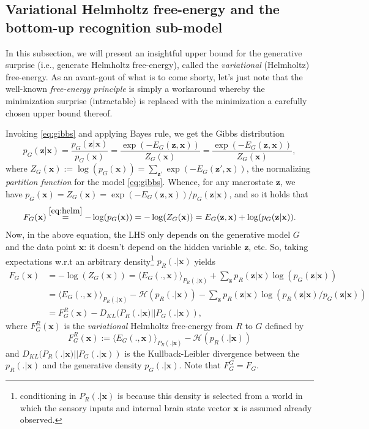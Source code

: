 \documentclass[10pt,letterpaper]{article}
\def\z{\mathbf{z}}
\def\x{\mathbf{x}}
\begin{document}
\subsection{Variational Helmholtz free-energy and the bottom-up recognition sub-model}
In this subsection, we will present an insightful upper bound for the generative surprise (i.e., generate Helmholtz free-energy), called the \textit{variational} (Helmholtz) free-energy. As an avant-gout of what is to come shorty, let's just note that the well-known \textit{free-energy principle} is simply a workaround whereby the minimization surprise (intractable) is replaced with the  minimization a carefully chosen upper bound thereof.

Invoking \eqref{eq:gibbs} and applying Bayes rule, we get the Gibbs
distribution
\begin{equation}
  p_G(\z|\x) = \frac{p_G(\z|\x)}{p_G(\x)} = \frac{\exp(-E_G(\z, \x))}{Z_G(\x)} = \frac{\exp(-E_G(\z, \x))}{Z_G(\x)},
\end{equation}
where $Z_G(\x) := \log(p_G(\x)) = \sum_{\z'}\exp(-E_G(\z',\x))$, the normalizing \textit{partition function} for the model \ref{eq:gibbs}.
Whence, for any macrostate $\z$, we have $p_G(\x) = Z_G(\x) = \exp(-E_G(\z, \x)) / p_G(\z|\x)$, and so it holds that
\begin{equation}
F_G(\x)\overset{\eqref{eq:helm}}{=} -\log(p_G(\x)) = -\log(Z_G(\x)) = E_G(\z, \x) + \log(p_G(\z|\x)).
\end{equation}
Now, in the above equation, the LHS only depends on the generative model $G$ and the data point $\x$:
it doesn't depend on the hidden variable $\z$, etc. So, taking expectations w.r.t an arbitrary
density\footnote{conditioning in $P_R(.|\x)$ is because this density is selected from a world in which the sensory inputs and internal brain
  state vector $\x$ is assumed already observed.} $p_R(.|\x)$ yields
\begin{equation}
  \begin{split}
    F_G(\x) &= -\log(Z_G(\x)) = \langle E_G(., \x)\rangle_{P_R(.|\x)} + \sum_{\z}p_R(\z|\x)\log(p_G(\z|\x))\\
    &= \langle E_G(., \x)\rangle_{P_R(.|\x)} - \mathcal H(p_R(.|\x)) - \sum_{\z}p_R(\z|\x)\log(p_R(\z|\x)/p_G(\z|\x))\\
    &= F^R_G(\x) - D_{KL}(P_R(.|\x) || P_G(.|\x)),
  \end{split}
  \label{eq:fe}
\end{equation}
where $F^R_G(\x)$ is the \textit{variational} Helmholtz free-energy from $R$ to $G$ defined by
\begin{equation}
  F^R_G(\x) := \langle E_G(., \x)\rangle_{P_R(.|\x)} - \mathcal H(p_R(.|\x))
\end{equation}
and $D_{KL}(P_R(.|\x) || P_G(.|\x))$ is the Kullback-Leibler divergence between the $p_R(.|\x)$ and the generative density $p_G(.|\x)$. Note that $F^G_G = F_G$.
\end{document}
